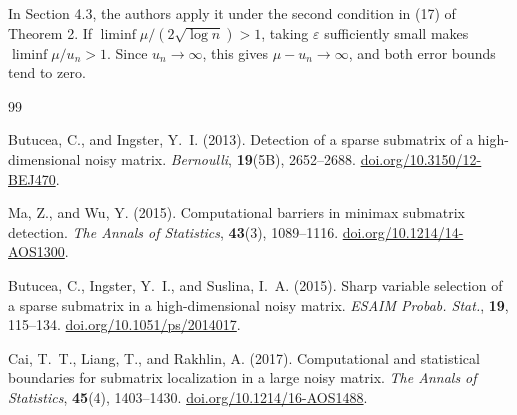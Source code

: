 \documentclass[12pt]{article}
\begin{document}
In Section 4.3, the authors apply it under the second condition in
(17) of Theorem 2. If $\liminf\mu/(2\sqrt{\log n})>1$, taking
$\varepsilon$ sufficiently small makes $\liminf\mu/u_n>1$. Since
$u_n\to\infty$, this gives $\mu-u_n\to\infty$, and both error bounds
tend to zero.




\clearpage
\begin{thebibliography}{99}

Butucea, C., and Ingster, Y.~I. (2013).
Detection of a sparse submatrix of a high-dimensional
noisy matrix.
\emph{Bernoulli}, \textbf{19}(5B), 2652--2688.
\href{https://doi.org/10.3150/12-BEJ470}{doi.org/10.3150/12-BEJ470}.

Ma, Z., and Wu, Y. (2015).
Computational barriers in minimax submatrix detection.
\emph{The Annals of Statistics},
\textbf{43}(3), 1089--1116.
\href{https://doi.org/10.1214/14-AOS1300}{doi.org/10.1214/14-AOS1300}.

Butucea, C., Ingster, Y.~I., and Suslina, I.~A. (2015).
Sharp variable selection of a sparse submatrix
in a high-dimensional noisy matrix.
\emph{ESAIM Probab. Stat.},
\textbf{19}, 115--134.
\href{https://doi.org/10.1051/ps/2014017}{doi.org/10.1051/ps/2014017}.

Cai, T.~T., Liang, T., and Rakhlin, A. (2017).
Computational and statistical boundaries for
submatrix localization in a large noisy matrix.
\emph{The Annals of Statistics},
\textbf{45}(4), 1403--1430.
\href{https://doi.org/10.1214/16-AOS1488}{doi.org/10.1214/16-AOS1488}.


\end{thebibliography}
\end{document}
